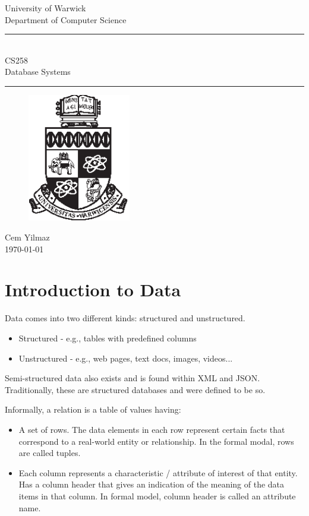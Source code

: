 \documentclass[a4paper]{article}
\theoremstyle{plain}
\theoremstyle{definition}
\newtheorem{defn}{Definition}[section]
\theoremstyle{remark}
\begin{document}
	\begin{titlepage}
	\begin{center}
	\large
	University of Warwick \\
	Department of Computer Science \\
	\huge
	\vspace{50mm}
	\rule{\linewidth}{0.5pt} \\
	CS258 \\
	\vspace{5mm}
	\Large
	Database Systems
	\rule{\linewidth}{0.5pt}
	\vspace{5mm}
	\begin{figure}[H]
	\centering
	\includegraphics[width=0.4\textwidth]{crest_black.eps}
	\end{figure}
	\vspace{37mm}
	Cem Yilmaz \\
	\today
	\end{center}
	\end{titlepage}
	\tableofcontents
	\newpage
	\section{Introduction to Data}
	Data comes into two different kinds: structured and unstructured.
	\begin{itemize}
		\item Structured - e.g., tables with predefined columns
		\item Unstructured - e.g., web pages, text docs, images, videos...
	\end{itemize}
	Semi-structured data also exists and is found within XML and JSON. Traditionally, these are structured databases and were defined to be so.
	\begin{tcolorbox}[colback=black!3!white,colframe=black!60!white,title=\begin{defn}Relation \label{Relation}\end{defn}]
	Informally, a relation is a table of values having:
	\begin{itemize}
		\item A set of rows. The data elements in each row represent certain facts that correspond to a real-world entity or relationship. In the formal modal, rows are called tuples.
		\item Each column represents a characteristic / attribute of interest of that entity. Has a column header that gives an indication of the meaning of the data items in that column. In formal model, column header is called an attribute name.
	\end{itemize}
	\end{tcolorbox}
\end{document}
